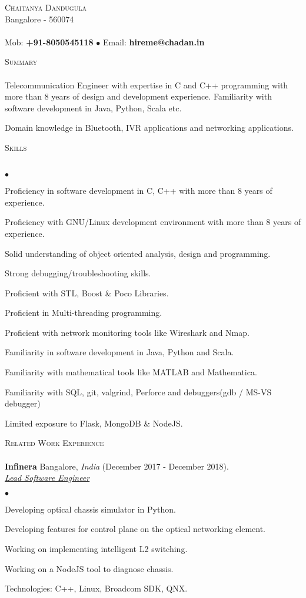 \documentclass[a4paper]{article}
\newcommand{\lineunder}{\vspace*{-8pt} \\ \hspace*{-18pt} \hrulefill \\}
\newcommand{\header}[1]{{\hspace*{-15pt}\vspace*{6pt} \textsc{#1}} \vspace*{-6pt} \lineunder}
\newcommand{\employer}[4]{{ \textbf{#1} #2  (#3).\\ \underline{\emph{#4}}\\  }}
\newcommand{\contact}[3]{
\vspace*{-8pt}
\begin{center}
{\LARGE \scshape {#1}}\\
#2 \lineunder
#3
\end{center}
\vspace*{-8pt}
}
\newenvironment{achievements}{\begin{list}{$\bullet$}{\topsep 0pt \itemsep -2pt}}{\vspace*{4pt}\end{list}}
\begin{document}
\small
\smallskip
\contact{Chaitanya Dandugula}
{Bangalore - 560074}
{Mob: \textbf{+91-8050545118} $\bullet$ Email: \textbf{hireme@chadan.in}}
\vspace*{5pt}

\header{Summary}
Telecommunication Engineer with expertise in C and C++ programming with more than 8 years of design and development experience. Familiarity with software development in Java, Python, Scala etc.

Domain knowledge in Bluetooth, IVR applications and networking applications.

\header{Skills}
\begin{achievements}
\item Proficiency in software development in C, C++ with more than 8 years of experience.
\item Proficiency with GNU/Linux development environment with more than 8 years of experience.
\item Solid understanding of object oriented analysis, design and programming.
\item Strong debugging/troubleshooting skills.
\item Proficient with STL, Boost \& Poco Libraries.
\item Proficient in Multi-threading programming.
\item Proficient with network monitoring tools like Wireshark and Nmap.
\item Familiarity in software development in Java, Python and Scala.
\item Familiarity with mathematical tools like MATLAB and Mathematica.
\item Familiarity with SQL, git, valgrind, Perforce and debuggers(gdb / MS-VS debugger)
\item Limited exposure to Flask, MongoDB \& NodeJS.
\end{achievements}

\header{Related Work Experience}
\employer{Infinera} {Bangalore, \textit{India}} {December 2017 - December 2018} {Lead Software Engineer}
	\begin{achievements}
          \item Developing optical chassis simulator in Python. 
          \item Developing features for control plane on the optical networking element.
          \item Working on implementing intelligent L2 switching.
          \item Working on a NodeJS tool to diagnose chassis.
          \item Technologies: C++, Linux, Broadcom SDK, QNX.
	\end{achievements}
\end{document}
